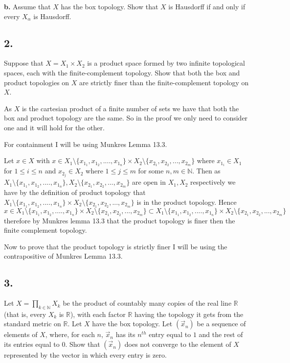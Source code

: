 \documentclass{amsart}
\theoremstyle{plain}
\theoremstyle{definition}
\theoremstyle{remark}
\begin{document}
\vspace{.1in}
{\bfseries b.} Assume that $X$ has the box topology. Show that $X$ is Hausdorff if and only if every $X_{\alpha}$ is Hausdorff. 





\vspace{.15in}
\noindent
\subsection*{2.} Suppose that $X = X_1 \times X_2$ is a product space formed by two infinite topological spaces, each with the finite-complement topology. Show that both the box and product topologies on $X$ are strictly finer than the finite-complement topology on $X$. 


As $X$ is the cartesian product of a finite number of sets we have that both the box and product topology are the same. So in the proof we only need to consider one and it will hold for the other. 

For containment I will be using Munkres Lemma 13.3. 

Let $x\in X$ with $x\in X_1\setminus \{x_{1_1},x_{1_2},....,x_{1_n}\}\times X_2\setminus \{x_{2_1},x_{2_2},...,x_{2_m}\}$ where $x_{1_{i}}\in X_1$ for $1 \leq i\leq n$ and $x_{2_j}\in X_2$ where $1\leq j \leq m$ for some $n,m\in \mathbb{N}$. Then as $X_1\setminus \{x_{1_1},x_{1_2},....,x_{1_n}\}, X_2\setminus \{x_{2_1},x_{2_2},...,x_{2_m}\}$ are open in $X_1,X_2$ respectively we have by the definition of product topology that $X_1\setminus \{x_{1_1},x_{1_2},....,x_{1_n}\}\times X_2\setminus \{x_{2_1},x_{2_2},...,x_{2_m}\}$ is in the product topology. Hence $x\in X_1\setminus \{x_{1_1},x_{1_2},....,x_{1_n}\}\times X_2\setminus \{x_{2_1},x_{2_2},...,x_{2_m}\}\subset X_1\setminus \{x_{1_1},x_{1_2},....,x_{1_n}\}\times X_2\setminus \{x_{2_1},x_{2_2},...,x_{2_m}\}$ therefore by Munkres lemma 13.3 that the product topology is finer then the finite complement topology.

Now to prove that the product topology is strictly finer I will be using the contrapositive of Munkres Lemma 13.3.




\vspace{.15in}

\noindent
\subsection*{3.} Let $X =\prod _{k\in \mathbb N} X_k$ be the product of countably many copies of the real line $\mathbb R$  (that is, every $X_k$ is $\mathbb R$), with each factor $\mathbb R$ having the topology it gets from the standard metric on $\mathbb R$. Let $X$ have the box topology. Let $(\vec{x}_n)$ be a sequence of elements of $X$, where, for each $n$, $\vec{x}_n$ has its $n^{th}$ entry equal to $1$ and the rest of its entries equal to $0$.  Show that $(\vec{x}_n)$ does not converge to the element of $X$ represented by the vector in which every entry is zero. 
\end{document}

